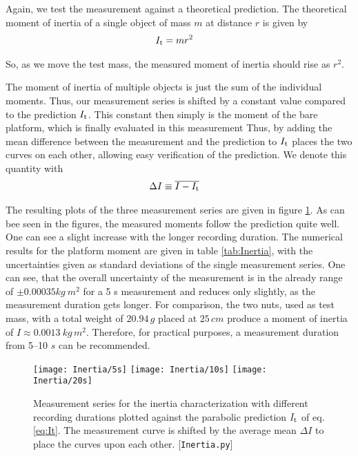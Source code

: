 \documentclass[journal]{IEEEtran}
\begin{document}
Again, we test the measurement against a theoretical prediction.
The theoretical moment of inertia of a single object of mass $m$ at distance $r$ is given by
\begin{align} 
	I_{\textup{t}} & = m r^2
	\label{eq:It}
\end{align}

So, as we move the test mass, the measured moment of inertia should rise as $r^2$.

The moment of inertia of multiple objects is just the sum of the individual moments. Thus, our measurement series is shifted by a constant value compared to the prediction $I_{\textup{t}}$. This constant then simply is the moment of the bare platform, which is finally evaluated in this measurement
Thus, by adding the mean difference between the measurement and the prediction to $I_{\textup{t}}$ places the two curves on each other, allowing easy verification of the prediction.
We denote this quantity with
\begin{align}
	\Delta I & \equiv \overline{I - I_{\textup{t}}}
	\label{eq:DeltaI}
\end{align}

The resulting plots of the three measurement series are given in figure \ref{fig:Inertia}.
As can bee seen in the figures, the measured moments follow the prediction quite well. One can see a slight increase with the longer recording duration.
The numerical results for the platform moment are given in table \ref{tab:Inertia}, with the uncertainties given as standard deviations of the single measurement series.
One can see, that the overall uncertainty of the measurement is in the already range of $\pm 0.00035 \unit{kg~m^2}$ for a 5 s measurement and reduces only slightly, as the measurement duration gets longer. For comparison, the two nuts, used as test mass, with a total weight of $20.94\,\unit{g}$ placed at $25\,\unit{cm}$ produce a moment of inertia of $I \approx 0.0013~\unit{kg\,m^2}$.
Therefore, for practical purposes, a measurement duration from 5--10 $\unit{s}$ can be recommended.

\begin{figure}[t]
	\centering
	\texttt{[image: Inertia/5s]}
	\texttt{[image: Inertia/10s]}
	\texttt{[image: Inertia/20s]}
	\caption{Measurement series for the inertia characterization with different recording durations plotted against the parabolic prediction $I_{\textup{t}}$ of eq. \eqref{eq:It}. The measurement curve is shifted by the average mean $\Delta I$ to place the curves upon each other. [\texttt{Inertia.py}]}
	\label{fig:Inertia}
\end{figure}
\end{document}
